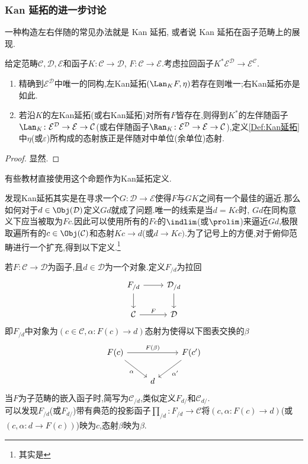 \subsubsection{Kan 延拓的进一步讨论}
一种构造左右伴随的常见办法就是 Kan 延拓, 或者说 Kan 延拓在函子范畴上的展现.
\begin{proposition}\label{Pro:Kan延拓定义}
    给定范畴$\mathcal{C},\mathcal{D},\mathcal{E}$和函子$K \colon \mathcal{C} \to \mathcal{D}$, $F \colon\mathcal{C} \to \mathcal{E}$.考虑拉回函子$K^* \mathcal{E}^{\mathcal{D}} \to \mathcal{E}^{\mathcal{C}}$.
    \begin{enumerate}
        \item 精确到$\mathcal{E}^{\mathcal{D}}$中唯一的同构,左Kan延拓$(\Lan_KF,\eta)$若存在则唯一;右Kan延拓亦是如此.
        \item 若沿$K$的左Kan延拓(或右Kan延拓)对所有$F$皆存在,则得到$K^*$的左伴随函子$\Lan_K \colon \mathcal{E}^{\mathcal{D}}\to \mathcal{E} \to \mathcal{C}$(或右伴随函子$\Ran_K \colon \mathcal{E}^{\mathcal{D}}\to \mathcal{E} \to \mathcal{C}$),定义\ref{Def:Kan延拓}中$\eta$(或$\varepsilon$)所构成的态射族正是伴随对中单位(余单位)态射.
    \end{enumerate}
\end{proposition}
\begin{proof}
    显然.
\end{proof}
\begin{remark}
    有些教材直接使用这个命题作为Kan延拓定义.
\end{remark}
发现Kan延拓其实是在寻求一个$G \colon \mathcal{D} \to \mathcal{E}$使得$F$与$GK$之间有一个最佳的逼近.那么如何对于$d \in \Obj(\mathcal{D})$定义$Gd$就成了问题.唯一的线索是当$d = Kc$时, $Gd$在同构意义下应当被取为$Fc$.因此可以使用所有的$Fc$的$\indlim$(或$\prolim$)来逼近$Gd$,极限取遍所有的$c \in \Obj(\mathcal{C})$和态射$Kc \to d$(或$d \to Kc)$.为了记号上的方便,对于俯仰范畴进行一个扩充,得到以下定义.\footnote{其实是\parencite[定义1.6.2]{李文威卷二}}
\begin{definition}
    若$F \colon \mathcal{C} \to \mathcal{D}$为函子,且$d \in \mathcal{D}$为一个对象.定义$F_{/d}$为拉回
    \[\begin{tikzcd}
	{F_{/d}} & {\mathcal{D}_{/d}} \\
	{\mathcal{C}} & {\mathcal{D}}
	\arrow[from=1-1, to=1-2]
	\arrow[from=1-1, to=2-1]
	\arrow[from=1-2, to=2-2]
	\arrow["F", from=2-1, to=2-2]
    \end{tikzcd}\]
    即$F_{/d}$中对象为$(c\in \mathcal{C},\alpha \colon F(c) \to d)$态射为使得以下图表交换的$\beta$
    \[\begin{tikzcd}
	{F(c)} && {F(c')} \\
	& d
	\arrow["{F(\beta)}", from=1-1, to=1-3]
	\arrow["\alpha"', from=1-1, to=2-2]
	\arrow["{\alpha'}", from=1-3, to=2-2]
    \end{tikzcd}\]
    当$F$为子范畴的嵌入函子时,简写为$\mathcal{C}_{/d}$,类似定义$F_{d/}$和$\mathcal{C}_{d/}$.\\
    可以发现$F_{/d}$(或$F_{d/}$)带有典范的投影函子$\prod_{/d}\colon F_{/d} \to \mathcal{C}$将$(c,\alpha\colon F(c) \to d)$(或$(c,\alpha\colon d \to F(c))$)映为$c$,态射$\beta$映为$\beta$.
\end{definition}
